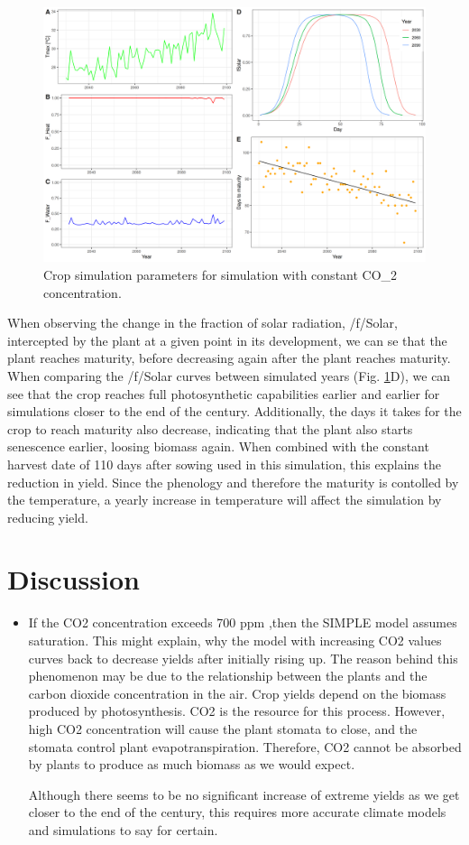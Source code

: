 \documentclass[11pt]{article}
\begin{document}
\begin{figure}[htbp]
\centering
\includegraphics[width=1\textwidth]{../results/cc-model/paras_sim.png}
\caption{\label{paras-sim}Crop simulation parameters for simulation with constant CO\_2 concentration.}
\end{figure}

When observing the change in the fraction of solar radiation, /f/Solar, intercepted by the plant at a given point in its development, we can se that the plant reaches maturity, before decreasing again after the plant reaches maturity. When comparing the /f/Solar curves between simulated years (Fig. \ref{paras-sim}D), we can see that the crop reaches full photosynthetic capabilities earlier and earlier for simulations closer to the end of the century. Additionally, the days it takes for the crop to reach maturity also decrease, indicating that the plant also starts senescence earlier, loosing biomass again. When combined with the constant harvest date of 110 days after sowing used in this simulation, this explains the reduction in yield. Since the phenology and therefore the maturity is contolled by the temperature, a yearly increase in temperature will affect the simulation by reducing yield.


\section{Discussion}
\label{sec:org047c6b2}
\begin{itemize}
\item If the CO2 concentration exceeds 700 ppm ,then the SIMPLE model assumes saturation. This might explain, why the model with increasing CO2 values curves back to decrease yields after initially rising up. The reason behind this phenomenon may be due to the relationship between the plants and the carbon dioxide concentration in the air. Crop yields depend on the biomass produced by photosynthesis. CO2 is the resource for this process. However, high CO2 concentration will cause the plant stomata to close, and the stomata control plant evapotranspiration. Therefore, CO2 cannot be absorbed by plants to produce as much biomass as we would expect.

Although there seems to be no significant increase of extreme yields as we get closer to the end of the century, this requires more accurate climate models and simulations to say for certain.
\end{itemize}
\end{document}
